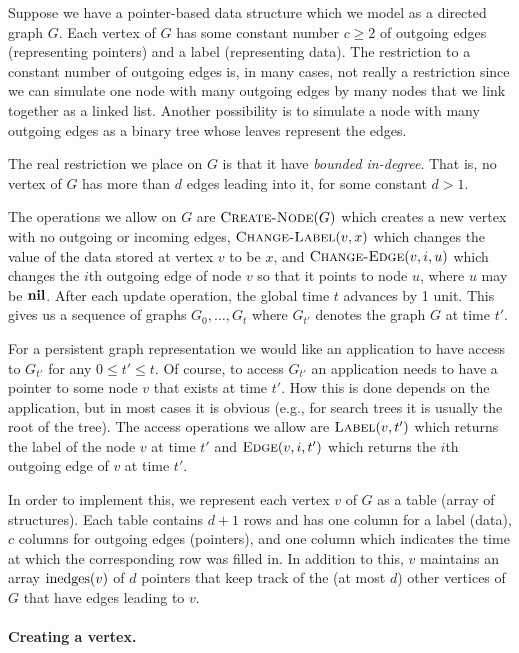 Suppose we have a pointer-based data structure which we model as a
directed graph $G$.  Each vertex of $G$ has some constant number $c\ge
2$ of outgoing edges (representing pointers) and a label (representing
data).  The restriction to a constant number of outgoing edges is, in
many cases, not really a restriction since we can simulate one node
with many outgoing edges by many nodes that we link together as a
linked list.  Another possibility is to simulate a node with many
outgoing edges as a binary tree whose leaves represent the edges.

The real restriction we place on $G$ is that it have \emph{bounded
in-degree}.  That is, no vertex of $G$ has more than $d$ edges leading
into it, for some constant $d>1$.

The operations we allow on $G$ are $\textsc{Create-Node}(G)$ which
creates a new vertex with no outgoing or incoming edges,
$\textsc{Change-Label}(v,x)$ which changes the value of the data
stored at vertex $v$ to be $x$, and $\textsc{Change-Edge}(v,i,u)$
which changes the $i$th outgoing edge of node $v$ so that it points to
node $u$, where $u$ may be $\mathbf{nil}$.  After each update operation, the
global time $t$ advances by 1 unit.  This gives us a sequence of
graphs $G_0,\ldots,G_t$ where $G_{t'}$ denotes the graph $G$ at time
$t'$.

For a persistent graph representation we would like an application to
have access to $G_{t'}$ for any $0\le t'\le t$.  Of course, to access
$G_{t'}$ an application needs to have a pointer to some node $v$ that
exists at time $t'$.  How this is done depends on the application, but
in most cases it is obvious (e.g., for search trees it is usually the
root of the tree).  The access operations we allow are
$\textsc{Label}(v,t')$ which returns the label of the node $v$ at time
$t'$ and $\textsc{Edge}(v,i,t')$ which returns the $i$th outgoing edge
of $v$ at time $t'$.

In order to implement this, we represent each vertex $v$ of $G$ as a
table (array of structures).  Each table contains $d+1$ rows and has
one column for a label (data), $c$ columns for outgoing edges
(pointers), and one column which indicates the time at which the
corresponding row was filled in.  In addition to this, $v$ maintains
an array $\mathrm{inedges}(v)$ of $d$ pointers that keep track of the (at most
$d$) other vertices of $G$ that have edges leading to $v$.

\paragraph{Creating a vertex.}

